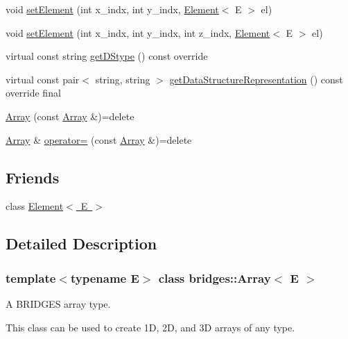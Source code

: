 \begin{DoxyCompactItemize}
\item 
void \mbox{\hyperlink{classbridges_1_1_array_a428cc76d22af71c5ae57dc293780b8ec}{set\+Element}} (int x\+\_\+indx, int y\+\_\+indx, \mbox{\hyperlink{classbridges_1_1_element}{Element}}$<$ E $>$ el)
\item 
void \mbox{\hyperlink{classbridges_1_1_array_a526c3a190b48a338541e5b4667c5eedf}{set\+Element}} (int x\+\_\+indx, int y\+\_\+indx, int z\+\_\+indx, \mbox{\hyperlink{classbridges_1_1_element}{Element}}$<$ E $>$ el)
\item 
virtual const string \mbox{\hyperlink{classbridges_1_1_array_ab93f7379870a7c0bc63490c53d95ba09}{get\+D\+Stype}} () const override
\item 
virtual const pair$<$ string, string $>$ \mbox{\hyperlink{classbridges_1_1_array_ab039fc0b5dd5683bbdf0fe71fce9d317}{get\+Data\+Structure\+Representation}} () const override final
\item 
\mbox{\hyperlink{classbridges_1_1_array_a3229045173ac984ca452e613b1ce1fa3}{Array}} (const \mbox{\hyperlink{classbridges_1_1_array}{Array}} \&)=delete
\item 
\mbox{\hyperlink{classbridges_1_1_array}{Array}} \& \mbox{\hyperlink{classbridges_1_1_array_af8a8b4fc43f57020db39207c80403e6f}{operator=}} (const \mbox{\hyperlink{classbridges_1_1_array}{Array}} \&)=delete
\end{DoxyCompactItemize}
\subsection*{Friends}
\begin{DoxyCompactItemize}
\item 
class \mbox{\hyperlink{classbridges_1_1_array_a8c6ff2a8dd3e27346dd25f588a78828a}{Element$<$ E $>$}}
\end{DoxyCompactItemize}


\subsection{Detailed Description}
\subsubsection*{template$<$typename E$>$\newline
class bridges\+::\+Array$<$ E $>$}

A B\+R\+I\+D\+G\+ES array type. 

This class can be used to create 1D, 2D, and 3D arrays of any type.

